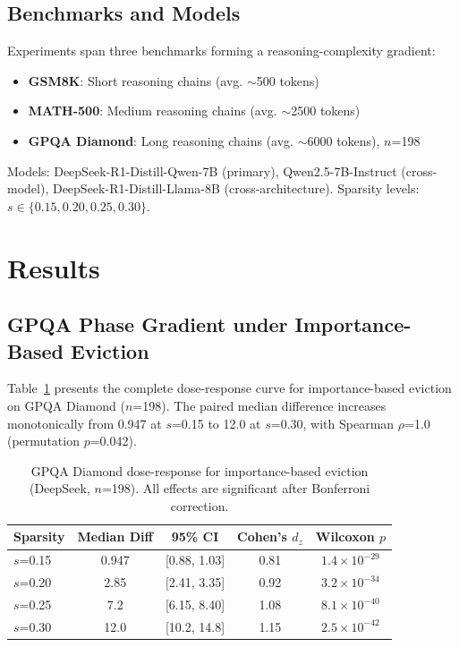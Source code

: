 \documentclass[11pt,a4paper]{article}
\begin{document}
\subsection{Benchmarks and Models}

Experiments span three benchmarks forming a reasoning-complexity gradient:
\begin{itemize}
\item \textbf{GSM8K}: Short reasoning chains (avg. $\sim$500 tokens)
\item \textbf{MATH-500}: Medium reasoning chains (avg. $\sim$2500 tokens)
\item \textbf{GPQA Diamond}: Long reasoning chains (avg. $\sim$6000 tokens), $n$=198
\end{itemize}

Models: DeepSeek-R1-Distill-Qwen-7B (primary), Qwen2.5-7B-Instruct (cross-model), DeepSeek-R1-Distill-Llama-8B (cross-architecture). Sparsity levels: $s \in \{0.15, 0.20, 0.25, 0.30\}$.

\section{Results}

\subsection{GPQA Phase Gradient under Importance-Based Eviction}

Table~\ref{tab:gpqa_dose_response} presents the complete dose-response curve for importance-based eviction on GPQA Diamond ($n$=198). The paired median difference increases monotonically from 0.947 at $s$=0.15 to 12.0 at $s$=0.30, with Spearman $\rho$=1.0 (permutation $p$=0.042).

\begin{table}[h]
\centering
\caption{GPQA Diamond dose-response for importance-based eviction (DeepSeek, $n$=198). All effects are significant after Bonferroni correction.}
\label{tab:gpqa_dose_response}
\begin{tabular}{lcccc}
\toprule
Sparsity & Median Diff & 95\% CI & Cohen's $d_z$ & Wilcoxon $p$ \\
\midrule
$s$=0.15 & 0.947 & [0.88, 1.03] & 0.81 & $1.4 \times 10^{-29}$ \\
$s$=0.20 & 2.85 & [2.41, 3.35] & 0.92 & $3.2 \times 10^{-34}$ \\
$s$=0.25 & 7.2 & [6.15, 8.40] & 1.08 & $8.1 \times 10^{-40}$ \\
$s$=0.30 & 12.0 & [10.2, 14.8] & 1.15 & $2.5 \times 10^{-42}$ \\
\bottomrule
\end{tabular}
\end{table}
\end{document}
